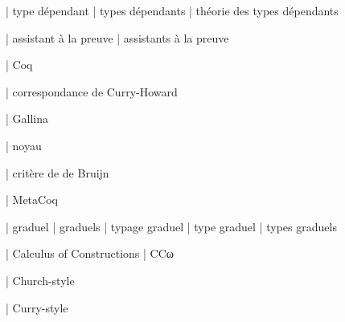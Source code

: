 

  | type dépendant
  | types dépendants
  | théorie des types dépendants

  | assistant à la preuve
  | assistants à la preuve

  | Coq

  | correspondance de Curry-Howard

  | Gallina

  | noyau

  | critère de de Bruijn

  | MetaCoq

  | graduel
  | graduels
  | typage graduel
  | type graduel
  | types graduels

  | Calculus of Constructions
  | CCω

  | Church-style

  | Curry-style